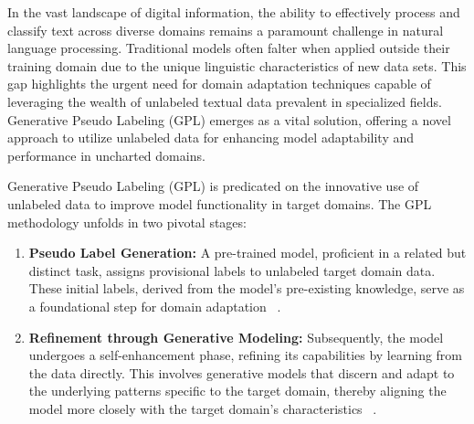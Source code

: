 \documentclass[fleqn,moreauthors,10pt]{ds_report}
\begin{document}
In the vast landscape of digital information, the ability to effectively process and classify text across diverse domains remains a paramount challenge in natural language processing. Traditional models often falter when applied outside their training domain due to the unique linguistic characteristics of new data sets. This gap highlights the urgent need for domain adaptation techniques capable of leveraging the wealth of unlabeled textual data prevalent in specialized fields. Generative Pseudo Labeling (GPL) emerges as a vital solution, offering a novel approach to utilize unlabeled data for enhancing model adaptability and performance in uncharted domains.

Generative Pseudo Labeling (GPL) is predicated on the innovative use of unlabeled data to improve model functionality in target domains. The GPL methodology unfolds in two pivotal stages:
\begin{enumerate}
    \item \textbf{Pseudo Label Generation:} A pre-trained model, proficient in a related but distinct task, assigns provisional labels to unlabeled target domain data. These initial labels, derived from the model's pre-existing knowledge, serve as a foundational step for domain adaptation ~\cite{reimers2019sentence}.
    
    \item \textbf{Refinement through Generative Modeling:} Subsequently, the model undergoes a self-enhancement phase, refining its capabilities by learning from the data directly. This involves generative models that discern and adapt to the underlying patterns specific to the target domain, thereby aligning the model more closely with the target domain's characteristics ~\cite{wang-etal-2022-gpl}.
\end{enumerate}    
\end{document}
